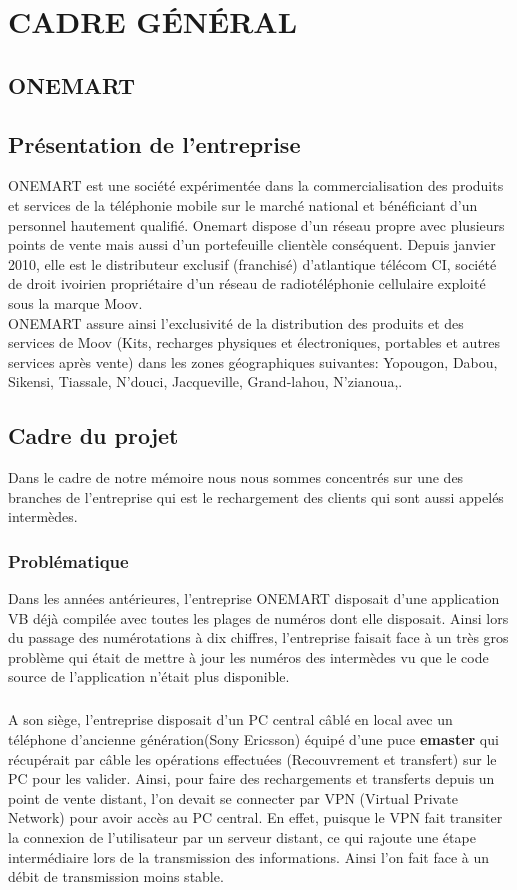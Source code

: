 \chapter{CADRE GÉNÉRAL}
\section{ONEMART}

\section{Présentation de l'entreprise}
	ONEMART est une société expérimentée dans la commercialisation des produits et services de la téléphonie mobile sur le marché national et bénéficiant d’un personnel hautement qualifié. Onemart dispose d’un réseau propre avec plusieurs points de vente mais aussi d’un portefeuille clientèle conséquent. Depuis janvier 2010, elle est le distributeur exclusif (franchisé) d’atlantique télécom CI, société de droit ivoirien propriétaire d’un réseau de radiotéléphonie cellulaire  exploité sous la marque Moov.\\
	
	ONEMART assure ainsi l’exclusivité de la distribution des produits et des services de Moov (Kits, recharges physiques et électroniques, portables et autres services après vente) dans les zones géographiques suivantes: Yopougon, Dabou, Sikensi, Tiassale, N’douci, Jacqueville, Grand-lahou, N’zianoua,.\\
	
	
\section{Cadre du projet} %
	Dans le cadre de notre mémoire nous nous sommes concentrés sur une des branches de l'entreprise qui est le rechargement des clients qui sont aussi appelés intermèdes.
\subsection{Problématique}
		Dans les années antérieures, l'entreprise ONEMART disposait d'une application VB déjà compilée avec toutes les plages de numéros dont elle disposait. Ainsi lors du passage des numérotations à dix chiffres, l'entreprise faisait face à un très gros problème qui était de mettre à jour les numéros des intermèdes vu que le code source de l'application n'était plus disponible.
		\paragraph{}A son siège, l'entreprise disposait d'un PC central câblé en local avec un téléphone d'ancienne génération(Sony Ericsson) équipé d'une puce \textbf{emaster} qui récupérait par câble les opérations effectuées (Recouvrement et transfert) sur le PC pour les valider. Ainsi, pour faire des rechargements et transferts depuis un point de vente distant, l'on devait se connecter par VPN (Virtual Private Network) pour avoir accès au PC central. En effet, puisque le VPN fait transiter la connexion de l'utilisateur par un serveur distant, ce qui rajoute une étape intermédiaire lors de la transmission des informations. Ainsi l'on fait face à un débit de transmission moins stable.
